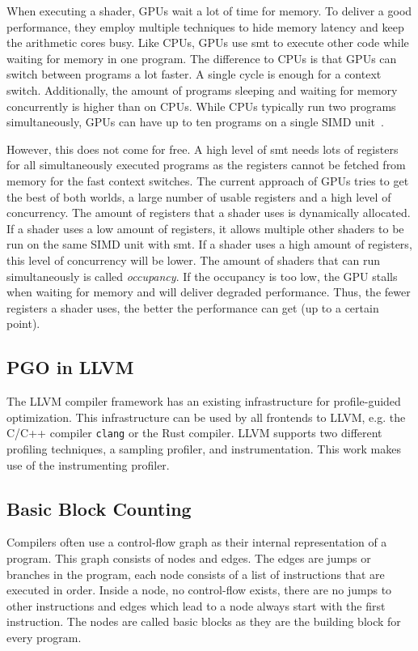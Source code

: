 When executing a shader, GPUs wait a lot of time for memory. To deliver a good performance, they employ multiple techniques to hide memory latency and keep the arithmetic cores busy.
Like CPUs, GPUs use \gls{smt} to execute other code while waiting for memory in one program.
The difference to CPUs is that GPUs can switch between programs a lot faster. A single cycle is enough for a context switch.
Additionally, the amount of programs sleeping and waiting for memory concurrently is higher than on CPUs.
While CPUs typically run two programs simultaneously, GPUs can have up to ten programs on a single SIMD unit~\cite{Aaltonen2017}.

However, this does not come for free. A high level of \gls{smt} needs lots of registers for all simultaneously executed programs as the registers cannot be fetched from memory for the fast context switches.
The current approach of GPUs tries to get the best of both worlds, a large number of usable registers and a high level of concurrency.
The amount of registers that a shader uses is dynamically allocated.
If a shader uses a low amount of registers, it allows multiple other shaders to be run on the same SIMD unit with \gls{smt}.
If a shader uses a high amount of registers, this level of concurrency will be lower.
The amount of shaders that can run simultaneously is called \emph{occupancy}.
If the occupancy is too low, the GPU stalls when waiting for memory and will deliver degraded performance.
Thus, the fewer registers a shader uses, the better the performance can get (up to a certain point).

\subsection{PGO in LLVM}
\label{sub:pgo-background}
The LLVM compiler framework has an existing infrastructure for profile-guided optimization. This infrastructure can be used by all frontends to LLVM, e.g. the C/C++ compiler \texttt{clang} or the Rust compiler. LLVM supports two different profiling techniques, a sampling profiler, and instrumentation.
This work makes use of the instrumenting profiler.

\subsection{Basic Block Counting}
\label{sub:counter-instrumentation}
Compilers often use a control-flow graph as their internal representation of a program.
This graph consists of nodes and edges. The edges are jumps or branches in the program, each node consists of a list of instructions that are executed in order.
Inside a node, no control-flow exists, there are no jumps to other instructions and edges which lead to a node always start with the first instruction.
The nodes are called basic blocks as they are the building block for every program.

